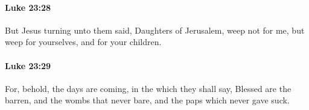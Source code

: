 		\paragraph{Luke 23:28} %
			\label{LUKE-23-28}

			But Jesus turning unto them said, Daughters of Jerusalem, weep not for me, but weep for yourselves, and for your children.

			\begin{framed}
			\scriptsize
				\begin{compactdesc}
					\item[SBLG] 
				\end{compactdesc}
			\end{framed}

		\paragraph{Luke 23:29} %
			\label{LUKE-23-29}

			For, behold, the days are coming, in the which they shall say, Blessed are the barren, and the wombs that never bare, and the paps which never gave suck.

